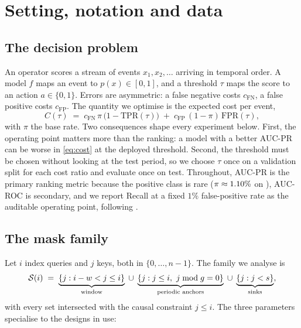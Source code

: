 \section{Setting, notation and data}\label{sec:setting}

\subsection{The decision problem}

An operator scores a stream of events $x_1,x_2,\dots$ arriving in temporal
order. A model $f$ maps an event to $p(x)\in[0,1]$, and a threshold $\tau$ maps
the score to an action $a\in\{0,1\}$. Errors are asymmetric: a false negative
costs $c_{\mathrm{FN}}$, a false positive costs $c_{\mathrm{FP}}$. The quantity
we optimise is the expected cost per event,
\begin{equation}
C(\tau) \;=\; c_{\mathrm{FN}}\,\pi\,\big(1-\mathrm{TPR}(\tau)\big)
\;+\; c_{\mathrm{FP}}\,(1-\pi)\,\mathrm{FPR}(\tau),
\label{eq:cost}
\end{equation}
with $\pi$ the base rate. Two consequences shape every experiment below.
First, the operating point matters more than the ranking: a model with a better
AUC-PR can be worse in \eqref{eq:cost} at the deployed threshold. Second, the
threshold must be chosen without looking at the test period, so we choose $\tau$
once on a validation split for each cost ratio and evaluate once on test.
Throughout, AUC-PR is the primary ranking metric because the positive class is
rare ($\pi\approx1.10\%$ on \DatasetBaf), AUC-ROC is secondary, and we
report Recall at a fixed $1\%$ false-positive rate as the auditable operating
point, following \cite{elkan2001foundations}.

\subsection{The mask family}\label{sec:family}

Let $i$ index queries and $j$ keys, both in $\{0,\dots,n-1\}$. The family we
analyse is
\begin{equation}
\mathcal{S}(i) \;=\; \underbrace{\{j : i-w < j \le i\}}_{\text{window}}
\;\cup\; \underbrace{\{j : j \le i,\ j \bmod g = 0\}}_{\text{periodic anchors}}
\;\cup\; \underbrace{\{j : j < s\}}_{\text{sinks}},
\label{eq:mask}
\end{equation}
with every set intersected with the causal constraint $j\le i$. The three
parameters specialise to the designs in use:

